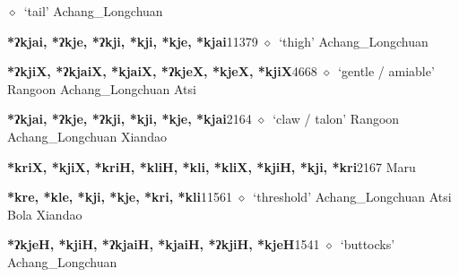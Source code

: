 \begin{list}{}{\leftmargin=1.5em \itemindent=-1.5em}
\hspace{1ex}
         $\diamond$~`tail'
         Achang\_Longchuan 
  \item {\footnotesize \textbf{*ʔkjai, *ʔkje, *ʔkji, *kji, *kje, *kjai}}{\tiny 11379}
\hspace{1ex}
         $\diamond$~`thigh'
         Achang\_Longchuan 
  \item {\footnotesize \textbf{*ʔkjiX, *ʔkjaiX, *kjaiX, *ʔkjeX, *kjeX, *kjiX}}{\tiny 4668}
\hspace{1ex}
         $\diamond$~`gentle / amiable'
         Rangoon 
\hspace{1ex}
         Achang\_Longchuan 
\hspace{1ex}
         Atsi 
  \item {\footnotesize \textbf{*ʔkjai, *ʔkje, *ʔkji, *kji, *kje, *kjai}}{\tiny 2164}
\hspace{1ex}
         $\diamond$~`claw / talon'
         Rangoon 
\hspace{1ex}
         Achang\_Longchuan 
\hspace{1ex}
         Xiandao 
  \item {\footnotesize \textbf{*kriX, *kjiX, *kriH, *kliH, *kli, *kliX, *kjiH, *kji, *kri}}{\tiny 2167}
\hspace{1ex}
         Maru 
  \item {\footnotesize \textbf{*kre, *kle, *kji, *kje, *kri, *kli}}{\tiny 11561}
\hspace{1ex}
         $\diamond$~`threshold'
         Achang\_Longchuan 
\hspace{1ex}
         Atsi 
\hspace{1ex}
         Bola 
\hspace{1ex}
         Xiandao 
  \item {\footnotesize \textbf{*ʔkjeH, *kjiH, *ʔkjaiH, *kjaiH, *ʔkjiH, *kjeH}}{\tiny 1541}
\hspace{1ex}
         $\diamond$~`buttocks'
         Achang\_Longchuan 

\end{list}
